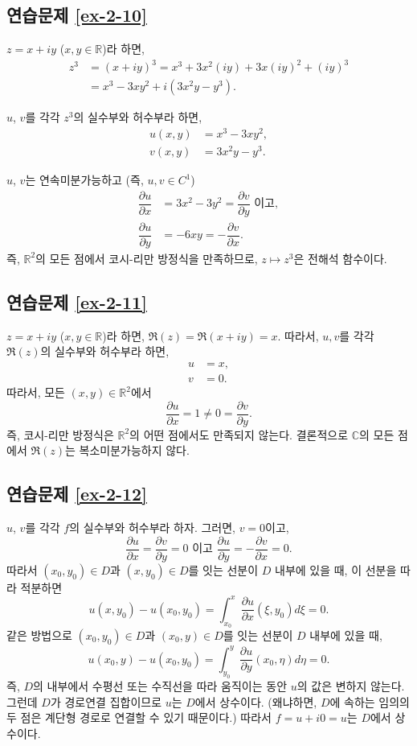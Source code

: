 \subsection*{연습문제 \ref{ex-2-10}}

$z = x+iy$ ($x,y\in\mathbb R$)라 하면,
\begin{align*}
z^3 &= (x+iy)^3 = x^3 + 3x^2(iy) + 3x(iy)^2 + (iy)^3 \\
&= x^3 - 3xy^2 + i(3x^2y-y^3).
\end{align*}

$u$, $v$를 각각 $z^3$의 실수부와 허수부라 하면,
\begin{align*}
u(x,y) &= x^3 -3xy^2, \\
v(x,y) &= 3x^2y - y^3.
\end{align*}

$u$, $v$는 연속미분가능하고 (즉, $u,v\in C^1$)
\begin{align*}
\dfrac{\partial u}{\partial x} &= 3x^2 -3y^2 = \dfrac{\partial v}{\partial y} \text{ 이고}, \\
\dfrac{\partial u}{\partial y} &= -6xy = - \dfrac{\partial v}{\partial x}.
\end{align*}
즉, $\mathbb R^2$의 모든 점에서 코시-리만 방정식을 만족하므로,
$z\mapsto z^3$은 전해석 함수이다.

\subsection*{연습문제 \ref{ex-2-11}}

$z = x+iy$ ($x,y\in\mathbb R$)라 하면,
$\Re(z) = \Re(x+iy) = x$.
따라서, $u, v$를 각각 $\Re(z)$의 실수부와 허수부라 하면,
\begin{align*}
u & =x, \\
v &=0.
\end{align*}
따라서, 모든 $(x,y) \in \mathbb R^2$에서
\[
\dfrac{\partial u}{\partial x}  = 1 \ne 0 =  \dfrac{\partial v}{\partial y}.
\]
즉, 코시-리만 방정식은 $\mathbb R^2$의 어떤 점에서도 만족되지 않는다.
결론적으로 $\mathbb C$의 모든 점에서 $\Re(z)$는 복소미분가능하지 않다.

\subsection*{연습문제 \ref{ex-2-12}}

$u$, $v$를 각각 $f$의 실수부와 허수부라 하자. 
그러면, $v=0$이고,
\[
\dfrac{\partial u}{\partial x} = \dfrac{\partial v}{\partial y} = 0
\text{ 이고 }
\dfrac{\partial u}{\partial y} = - \dfrac{\partial v}{\partial x} = 0.
\]
따라서 $(x_0,y_0)\in D$과 $(x, y_0)\in D$를 잇는 선분이  $D$ 내부에 있을 때, 이 선분을 따라 적분하면
\[
u(x,y_0) - u(x_0,y_0) = \int_{x_0}^x \dfrac{\partial u}{\partial x}(\xi, y_0) d\xi = 0.
\]
같은 방법으로 
 $(x_0,y_0)\in D$과 $(x_0, y)\in D$를 잇는 선분이  $D$ 내부에 있을 때, 
\[
u(x_0,y) - u(x_0,y_0) = \int_{y_0}^y \dfrac{\partial u}{\partial y}(x_0, \eta) d\eta = 0.
\]
즉, $D$의 내부에서 수평선 또는 수직선을 따라 움직이는 동안 $u$의 값은 변하지 않는다.
그런데 $D$가 경로연결 집합이므로 $u$는 $D$에서 상수이다.
(왜냐하면, $D$에 속하는 임의의  두 점은 계단형 경로로 연결할 수 있기 때문이다.)
따라서 $f=u+i0 = u$는 $D$에서 상수이다.

